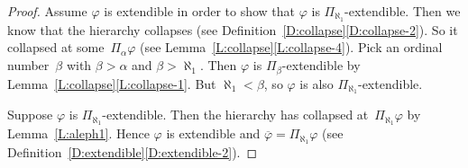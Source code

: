 \documentclass[main.tex]{subfiles}
\begin{document}
\begin{proof}
Assume $\varphi$ is extendible
in order to show that $\varphi$ is $\Pi_{\aleph_1}$-extendible.
Then we know that the hierarchy collapses 
(see Definition~\ref{D:collapse}\ref{D:collapse-2}).
So it collapsed at some~$\Pi_\alpha \varphi$
(see Lemma~\ref{L:collapse}\ref{L:collapse-4}).
Pick an ordinal number~$\beta$ with $\beta > \alpha$
and $\beta > \aleph_1$.
Then $\varphi$ is $\Pi_\beta$-extendible
by Lemma~\ref{L:collapse}\ref{L:collapse-1}.
But $\aleph_1 <\beta$,
so $\varphi$ is also $\Pi_{\aleph_1}$-extendible.

Suppose $\varphi$ is $\Pi_{\aleph_1}$-extendible.
Then the hierarchy has collapsed at~$\Pi_{\aleph_1}\varphi$
by Lemma~\ref{L:aleph1}.
Hence 
$\varphi$ is extendible
and  $\overline\varphi = \Pi_{\aleph_1}\varphi$
(see Definition~\ref{D:extendible}\ref{D:extendible-2}).
\end{proof}
\end{document}
